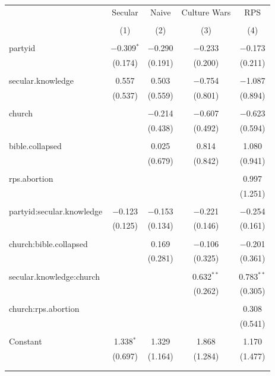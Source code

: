 \documentclass[12pt,letterpaper]{article}
\begin{document}
\begin{description}
\begin{table}[H]
\begin{tabular}{@{\extracolsep{5pt}}lcccc}
		& Secular & Naive & Culture Wars & RPS \\ 
		\\[-1.8ex] & (1) & (2) & (3) & (4)\\ 
		\hline \\[-1.8ex] 
		partyid & $-$0.309$^{*}$ & $-$0.290 & $-$0.233 & $-$0.173 \\ 
		& (0.174) & (0.191) & (0.200) & (0.211) \\ 
		& & & & \\ 
		secular.knowledge & 0.557 & 0.503 & $-$0.754 & $-$1.087 \\ 
		& (0.537) & (0.559) & (0.801) & (0.894) \\ 
		& & & & \\ 
		church &  & $-$0.214 & $-$0.607 & $-$0.623 \\ 
		&  & (0.438) & (0.492) & (0.594) \\ 
		& & & & \\ 
		bible.collapsed &  & 0.025 & 0.814 & 1.080 \\ 
		&  & (0.679) & (0.842) & (0.941) \\ 
		& & & & \\ 
		rps.abortion &  &  &  & 0.997 \\ 
		&  &  &  & (1.251) \\ 
		& & & & \\ 
		partyid:secular.knowledge & $-$0.123 & $-$0.153 & $-$0.221 & $-$0.254 \\ 
		& (0.125) & (0.134) & (0.146) & (0.161) \\ 
		& & & & \\ 
		church:bible.collapsed &  & 0.169 & $-$0.106 & $-$0.201 \\ 
		&  & (0.281) & (0.325) & (0.361) \\ 
		& & & & \\ 
		secular.knowledge:church &  &  & 0.632$^{**}$ & 0.783$^{**}$ \\ 
		&  &  & (0.262) & (0.305) \\ 
		& & & & \\ 
		church:rps.abortion &  &  &  & 0.308 \\ 
		&  &  &  & (0.541) \\ 
		& & & & \\ 
		Constant & 1.338$^{*}$ & 1.329 & 1.868 & 1.170 \\ 
		& (0.697) & (1.164) & (1.284) & (1.477) \\ 
		& & & & \\ 
		\hline \\[-1.8ex] 

\end{tabular}
\end{table}
\end{description}
\end{document}
